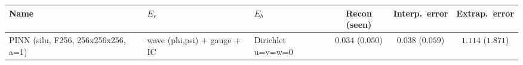 \begin{center}
\begin{tabular}{lll ccc}
\toprule
Name & $E_r$ & $E_b$ & Recon (seen) & Interp.\ error & Extrap.\ error \\
\midrule
PINN (silu, F256, 256x256x256, a=1) & wave (phi,psi) + gauge + IC & Dirichlet u=v=w=0 & $0.034$ ($0.050$) & $0.038$ ($0.059$) & $1.114$ ($1.871$) \\
\bottomrule
\end{tabular}
\end{center}
